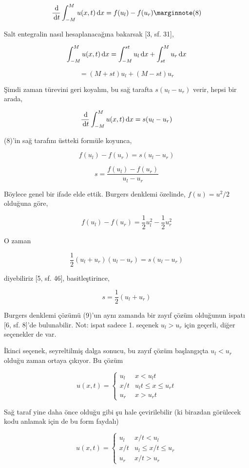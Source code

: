 \documentclass[12pt,fleqn]{article}\usepackage{../../common}
\begin{document}
$$
\frac{\ud}{\ud t} \int_{-M}^{M} u(x,t) \ud x = f(u_l) - f(u_r)
\mlabel{8}
$$

Salt entegralin nasıl hesaplanacağına bakarsak [3, sf. 31],

$$
\int_{-M}^{M} u(x,t) \,\mathrm{d} x =
\int_{-M}^{st} u_l \,\mathrm{d} x + 
\int_{st}^{M} u_r \,\mathrm{d} x
$$

$$
= (M+st)u_l + (M-st)u_r
$$

Şimdi zaman türevini geri koyalım, bu sağ tarafta $s(u_l-u_r)$ verir, hepsi
bir arada,

$$
\frac{\,\mathrm{d}}{\,\mathrm{d} t} \int_{-M}^{M} u(x,t) \,\mathrm{d} x = s(u_l-u_r)
$$

(8)'in sağ tarafını üstteki formüle koyunca,

$$
f(u_l) - f(u_r) = s(u_l-u_r)
$$

$$
s = \frac{f(u_l) - f(u_r)}{u_l-u_r}
$$

Böylece genel bir ifade elde ettik. Burgers denklemi özelinde,
$f(u) = u^2 / 2$ olduğuna göre,

$$
f(u_l) - f(u_r) = \frac{1}{2} u_l^2 -  \frac{1}{2} u_r^2
$$

O zaman

$$
\frac{1}{2} (u_l + u_r)(u_l - u_r) = s(u_l-u_r)
$$

diyebiliriz [5, sf. 46], basitleştirince,

$$
s = \frac{1}{2} (u_l + u_r)
$$

Burgers denklemi çözümü (9)'un aynı zamanda bir zayıf çözüm olduğunun ispatı
[6, sf. 8]'de bulunabilir. Not: ispat sadece 1. seçenek $u_l > u_r$ için
geçerli, diğer seçenekler de var.

İkinci seçenek, seyreltilmiş dalga sonucu, bu zayıf çözüm başlangıçta
$u_l < u_r$ olduğu zaman ortaya çıkıyor. Bu çözüm

$$
u(x,t) =
\left\{ \begin{array}{ll}
u_l & x < u_l t  \\
x/t & u_l t \le x \le u_r t \\
u_r & x > u_r t
\end{array} \right.
$$

Sağ taraf yine daha önce olduğu gibi şu hale çevirilebilir (ki birazdan
görülecek kodu anlamak için de bu form faydalı)

$$
u(x,t) =
\left\{ \begin{array}{ll}
u_l & x/t < u_l \\
x/t & u_l \le x/t \le u_r  \\
u_r & x/t > u_r 
\end{array} \right. 
$$
\end{document}
